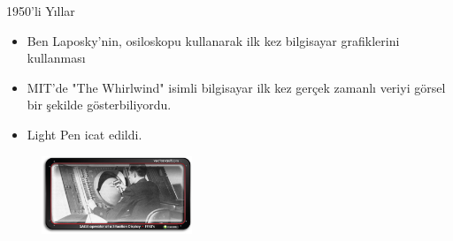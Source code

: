 \documentclass{beamer}
\begin{document}
\begin{frame}{1950'li Yıllar}
\begin{itemize}
\item Ben Laposky'nin, osiloskopu kullanarak ilk kez bilgisayar grafiklerini kullanması 
\item MIT'de "The Whirlwind" isimli bilgisayar ilk kez gerçek zamanlı veriyi görsel bir şekilde gösterbiliyordu.
\item Light Pen icat edildi.
\end{itemize}
\begin{figure}
\includegraphics[width=0.4\textwidth]{artist.jpg} 
\caption{}
\end{figure}
\end{frame}
\end{document}
